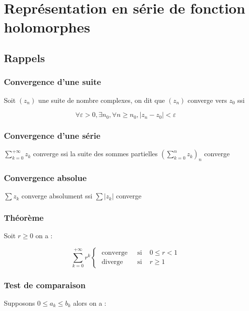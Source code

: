 \documentclass[a4paper,10pt]{report}
\newcommand{\abs}[1]{\left\vert #1 \right\vert}
\begin{document}
\chapter{Représentation en série de fonction holomorphes}

\section{Rappels}

\subsection{Convergence d'une suite}

Soit $(z_n)$ une suite de nombre complexes, on dit que $(z_n)$ converge vers $z_0$ ssi

\[ \forall \varepsilon > 0, \exists n_0, \forall n \geq n_0, \abs{z_n - z_0} < \varepsilon \]

\subsection{Convergence d'une série}

$\sum_{k=0}^{+\infty} z_k$ converge ssi la suite des sommes partielles $\left( \sum_{k=0}^n z_k \right)_n$ converge

\subsection{Convergence absolue}

$\sum z_k$ converge absolument ssi $\sum \abs{z_k}$ converge

\subsection{Théorème}

Soit $r \geq 0$ on a :

\[ \sum_{k=0}^{+\infty} r^k \left\{ \begin{array}{ccc}
\mbox{ converge } & \mbox{ si } & 0 \leq r < 1 \\
\mbox{ diverge } & \mbox{ si } & r \geq 1
\end{array} \right. \]

\subsection{Test de comparaison}

Supposons $0 \leq a_k \leq b_k$ alors on a :
\end{document}
